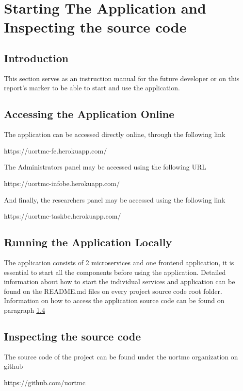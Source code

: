 \chapter{Starting The Application and Inspecting the source code}
\label{start-stop-guide}
	\section{Introduction}
		This section serves as an instruction manual for the future developer or on this report's marker to be able to start and use the 
		application.
	\section{Accessing the Application Online}
		The application can be accessed directly online, through the following link
		\begin{center}
			https://uortmc-fe.herokuapp.com/
		\end{center}
		The Administrators panel may be accessed using the following URL
		\begin{center}
			https://uortmc-infobe.herokuapp.com/
		\end{center}
		And finally, the researchers panel may be accessed using the following link
		\begin{center}
			https://uortmc-taskbe.herokuapp.com/
		\end{center}
	\section{Running the Application Locally}
		The application consists of 2 microservices and one frontend application, it is essential to start all the components before using
		the application. Detailed information about how to start the individual services and application can be found on the README.md files
		on every project source code root folder. Information on how to access the application source code can be found on paragraph \ref{inspect-source-code}
	\section{Inspecting the source code}
		\label{inspect-source-code}
		The source code of the project can be found under the uortmc organization on github
		\begin{center}
			https://github.com/uortmc
		\end{center}



